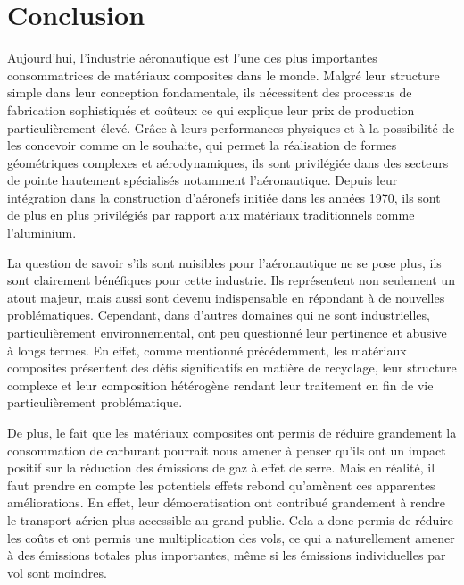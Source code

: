 \chapter{Conclusion}



Aujourd'hui, l'industrie aéronautique est l'une des plus importantes consommatrices de matériaux composites dans le monde.
Malgré leur structure simple dans leur conception fondamentale, ils nécessitent des processus de fabrication sophistiqués et coûteux ce qui explique leur prix de production particulièrement élevé.
Grâce à leurs performances physiques et à la possibilité de les concevoir comme on le souhaite, qui permet la réalisation de formes géométriques complexes et aérodynamiques, ils sont privilégiée dans des secteurs de pointe hautement spécialisés notamment l'aéronautique.
Depuis leur intégration dans la construction d'aéronefs initiée dans les années 1970, ils sont de plus en plus privilégiés par rapport aux matériaux traditionnels comme l'aluminium.

\vspace{15pt}
La question de savoir s'ils sont nuisibles pour l'aéronautique ne se pose plus, ils sont clairement bénéfiques pour cette industrie.
Ils représentent non seulement un atout majeur, mais aussi sont devenu indispensable en répondant à de nouvelles problématiques.
Cependant, dans d'autres domaines qui ne sont industrielles, particulièrement environnemental, ont peu questionné leur pertinence et abusive à longs termes.
En effet, comme mentionné précédemment, les matériaux composites présentent des défis significatifs en matière de recyclage, leur structure complexe et leur composition hétérogène rendant leur traitement en fin de vie particulièrement problématique.

\vspace{15pt}
De plus, le fait que les matériaux composites ont permis de réduire grandement la consommation de carburant pourrait nous amener à penser qu'ils ont un impact positif sur la réduction des émissions de gaz à effet de serre. Mais en réalité, il faut prendre en compte les potentiels effets rebond qu'amènent ces apparentes améliorations. En effet, leur démocratisation ont contribué grandement à rendre le transport aérien plus accessible au grand public. Cela a donc permis de réduire les coûts et ont permis une multiplication des vols, ce qui a naturellement amener à des émissions totales plus importantes, même si les émissions individuelles par vol sont moindres.



